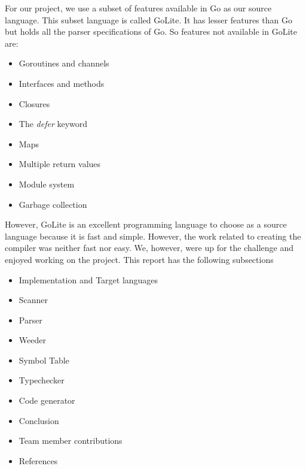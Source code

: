\documentclass[a4paper]{article}
\begin{document}
For our project, we use a subset of features available in Go as our source language. This subset language is called GoLite. It has lesser features than Go but holds all the parser specifications of Go. So features not available in GoLite are:
\begin{itemize}
	\item Goroutines and channels
    \item Interfaces and methods
    \item Closures
    \item The \textit{defer} keyword
    \item Maps
    \item Multiple return values
    \item Module system
    \item Garbage collection
\end{itemize}

However, GoLite is an excellent programming language to choose as a source language because it is fast and simple. However, the work related to creating the compiler was neither fast nor easy. We, however, were up for the challenge and enjoyed working on the project. 
\newline \newline
This report has the following subsections
\begin{itemize}
	\item Implementation and Target languages
    \item Scanner
    \item Parser
    \item Weeder
    \item Symbol Table
    \item Typechecker
    \item Code generator
    \item Conclusion
    \item Team member contributions
    \item References
\end{itemize}
\end{document}
